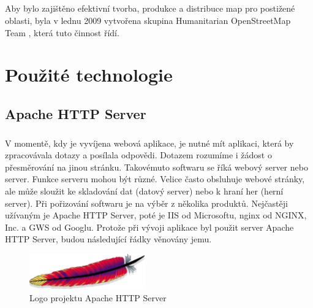 \documentclass[11pt,a4paper,titlepage,oneside]{book}
\begin{document}
		\paragraph{} Aby bylo zajištěno efektivní tvorba, produkce a distribuce map pro postižené oblasti, byla v lednu 2009 vytvořena skupina Humanitarian OpenStreetMap Team \cite{wiki_hot}, která tuto činnost řídí.
	

\chapter{Použité technologie}
	\section{Apache HTTP Server}
		\paragraph{} V momentě, kdy je vyvíjena webová aplikace, je nutné mít aplikaci, která by zpracovávala dotazy a posílala odpovědi. Dotazem rozumíme i žádost o přesměrování na jinou stránku. Takovémuto softwaru se říká webový server nebo server. Funkce serveru mohou být různé. Velice často obsluhuje webové stránky, ale může sloužit ke skladování dat (datový server) nebo k hraní her (herní server). Při pořizování softwaru je na výběr z několika produktů. Nejčastěji užívaným je Apache HTTP Server, poté je IIS od Microsoftu, nginx od NGINX, Inc. a GWS od Googlu. Protože při vývoji aplikace byl použit server Apache HTTP Server, budou následující řádky věnovány jemu.
		\begin{figure}[!h]
			\begin{center}
				\includegraphics[width=5cm]{obrazky/apacheLogo.png}
				\caption{Logo projektu Apache HTTP Server}
			\end{center}
		\end{figure}
\end{document}
